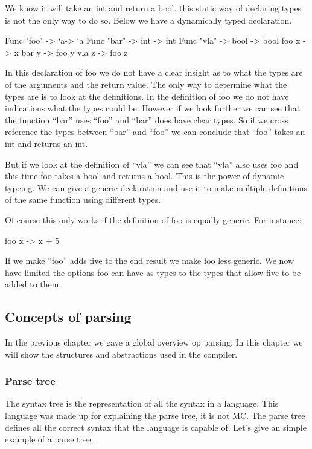 We know it will take an int and return a bool. this static way of declaring types is not the only way to do so. Below we have a dynamically typed declaration. 

\begin{code}
	Func "foo" -> ‘a-> ‘a 
	Func "bar" -> int -> int 
	Func "vla" -> bool -> bool 
	foo x -> x 
	bar y -> foo y 
	vla z -> foo z
\end{code}

In this declaration of foo we do not have a clear insight as to what the types are of the arguments and the return value. The only way to determine what the types are is to look at the definitions. In the definition of foo we do not have indications what the types could be. However if we look further we can see that the function “bar” uses “foo” and “bar” does have clear types. So if we cross reference the types between “bar” and “foo” we can conclude that “foo” takes an int and returns an int. 

But if we look at the definition of “vla” we can see that “vla” also uses foo and this time foo takes a bool and returns a bool. This is the power of dynamic typeing. We can give a generic declaration and use it to make multiple definitions of the same function using different types. 

Of course this only works if the definition of foo is equally generic. For instance:

\begin{code}
	foo x -> x + 5 
\end{code}

If we make “foo” adds five to the end result we make foo less generic. We now have limited the options foo can have as types to the types that allow five to be added to them.

\subsection{Concepts of parsing}

In the previous chapter we gave a global overview op parsing. In this chapter we will show the structures and abstractions used in the compiler. 

\subsubsection{Parse tree}

The syntax tree is the representation of all the syntax in a language. This language was made up for explaining the parse tree, it is not MC. The parse tree defines all the correct syntax that the language is capable of. Let’s give an simple example of a parse tree.

